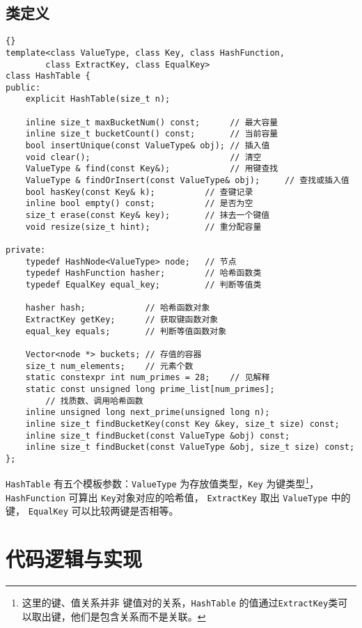 \subsection{类定义}
{
\begin{lstlisting}[firstnumber=283, caption=HashTable 类定义]{}
template<class ValueType, class Key, class HashFunction,
        class ExtractKey, class EqualKey>
class HashTable {
public:
    explicit HashTable(size_t n);

    inline size_t maxBucketNum() const;      // 最大容量
    inline size_t bucketCount() const;       // 当前容量
    bool insertUnique(const ValueType& obj); // 插入值
    void clear();                            // 清空
    ValueType & find(const Key&);            // 用键查找
    ValueType & findOrInsert(const ValueType& obj);     // 查找或插入值
    bool hasKey(const Key& k);          // 查键记录
    inline bool empty() const;          // 是否为空
    size_t erase(const Key& key);       // 抹去一个键值
    void resize(size_t hint);           // 重分配容量

private:
    typedef HashNode<ValueType> node;   // 节点
    typedef HashFunction hasher;        // 哈希函数类
    typedef EqualKey equal_key;         // 判断等值类

    hasher hash;            // 哈希函数对象
    ExtractKey getKey;      // 获取键函数对象
    equal_key equals;       // 判断等值函数对象

    Vector<node *> buckets; // 存值的容器
    size_t num_elements;    // 元素个数
    static constexpr int num_primes = 28;    // 见解释
    static const unsigned long prime_list[num_primes];
        // 找质数、调用哈希函数
    inline unsigned long next_prime(unsigned long n);
    inline size_t findBucketKey(const Key &key, size_t size) const;
    inline size_t findBucket(const ValueType &obj) const;
    inline size_t findBucket(const ValueType &obj, size_t size) const;
};
\end{lstlisting}


\lstinline{HashTable} 有五个模板参数：\lstinline{ValueType} 为存放值类型，\lstinline{Key} 为键类型\footnote{这里的键、值关系并非%
键值对的关系，\lstinline{HashTable} 的值通过\lstinline{ExtractKey}类可以取出键，他们是包含关系而不是关联。}，%
\lstinline{HashFunction} 可算出 \lstinline{Key}对象对应的哈希值， \lstinline{ExtractKey} 取出 \lstinline{ValueType} 中的键，%
\lstinline{EqualKey} 可以比较两键是否相等。

\section{代码逻辑与实现}

}
